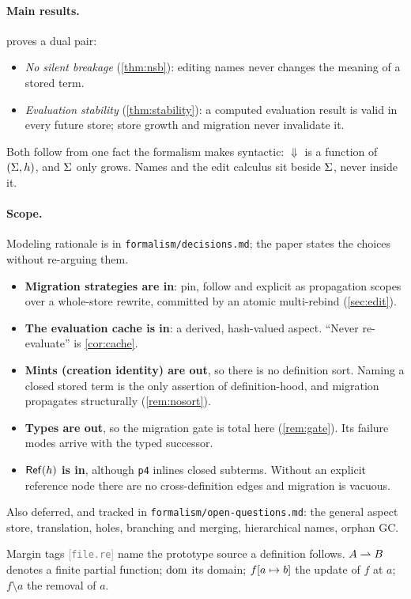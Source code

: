 \documentclass[11pt]{article}
\theoremstyle{definition}
\theoremstyle{plain}
\theoremstyle{remark}
\newcommand{\src}[1]{{\footnotesize\textcolor{gray}{[\texttt{#1}]}}}
\begin{document}
\paragraph{Main results.}  proves a dual pair:
\begin{itemize}[nosep]
  \item \emph{No silent breakage} (\cref{thm:nsb}): editing names never changes the meaning
  of a stored term.
  \item \emph{Evaluation stability} (\cref{thm:stability}): a computed evaluation result is
  valid in every future store; store growth and migration never invalidate it.
\end{itemize}
Both follow from one fact the formalism makes syntactic: $\Downarrow$ is a function of
$(\Sigma, h)$, and $\Sigma$ only grows. Names and the edit calculus sit beside $\Sigma$, never
inside it.

\paragraph{Scope.} Modeling rationale is in \texttt{formalism/decisions.md}; the paper states
the choices without re-arguing them.
\begin{itemize}[nosep]
  \item \textbf{Migration strategies are in}: pin, follow and explicit as propagation scopes
  over a whole-store rewrite, committed by an atomic multi-rebind (\cref{sec:edit}).
  \item \textbf{The evaluation cache is in}: a derived, hash-valued aspect. ``Never
  re-evaluate'' is \cref{cor:cache}.
  \item \textbf{Mints (creation identity) are out}, so there is no definition sort. Naming a
  closed stored term is the only assertion of definition-hood, and migration propagates
  structurally (\cref{rem:nosort}).
  \item \textbf{Types are out}, so the migration gate is total here (\cref{rem:gate}). Its
  failure modes arrive with the typed successor.
  \item \textbf{$\mathsf{Ref}(h)$ is in}, although \texttt{p4} inlines closed subterms. Without an
  explicit reference node there are no cross-definition edges and migration is vacuous.
\end{itemize}
Also deferred, and tracked in \texttt{formalism/open-questions.md}: the general aspect store,
translation, holes, branching and merging, hierarchical names, orphan GC.

\bigskip
Margin tags \src{file.re} name the prototype source a definition follows. $A \rightharpoonup B$ denotes a finite partial function; $\operatorname{dom}$ its domain; $f[a \mapsto b]$ the update
of $f$ at $a$; $f \mathord{\setminus} a$ the removal of $a$.
\end{document}
